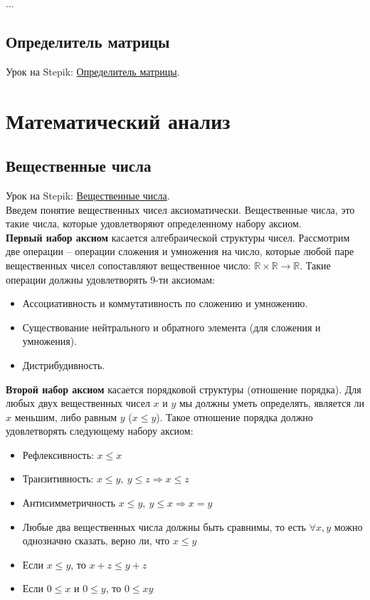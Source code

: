 \documentclass{article}
\begin{document}
...

\subsection{Определитель матрицы}

Урок на Stepik: \href{https://stepik.org/lesson/44077/step/1?unit=21901}{Определитель матрицы}.

\section{Математический анализ}

\subsection{Вещественные числа}

Урок на Stepik: \href{https://stepik.org/lesson/28445/step/3?unit=9589}{Вещественные числа}. \\

Введем понятие вещественных чисел аксиоматически. Вещественные числа, это такие числа, которые удовлетворяют определенному набору аксиом. \\

\textbf{Первый набор аксиом} касается алгебраической структуры чисел. Рассмотрим две операции -- операции сложения и умножения на число, которые любой паре вещественных чисел сопоставляют вещественное число: $\mathbb{R} \times \mathbb{R} \to \mathbb{R}$. Такие операции должны удовлетворять 9-ти аксиомам:

\begin{itemize}
	\item Ассоциативность и коммутативность по сложению и умножению.
	\item Существование нейтрального и обратного элемента (для сложения и умножения).
	\item Дистрибудивность.
\end{itemize}

\textbf{Второй набор аксиом} касается порядковой структуры (отношение порядка). Для любых двух вещественных чисел $x$ и $y$ мы должны уметь определять, является ли $x$ меньшим, либо равным $y$ ($x \le y$). Такое отношение порядка должно удовлетворять следующему набору аксиом:

\begin{itemize}
	\item Рефлексивность: $x \le x$
	\item Транзитивность: $x \le y, \ y \le z \Rightarrow x \le z$
	\item Антисимметричность $x \le y, \ y \le x \Rightarrow x = y$
	\item Любые два вещественных числа должны быть сравнимы, то есть $\forall x, y$ можно однозначно сказать, верно ли, что $x \le y$
	\item Если $x \le y$, то $x + z \le y + z$
	\item Если $0 \le x$ и $0 \le y$, то $0 \le xy$
\end{itemize}
\end{document}

